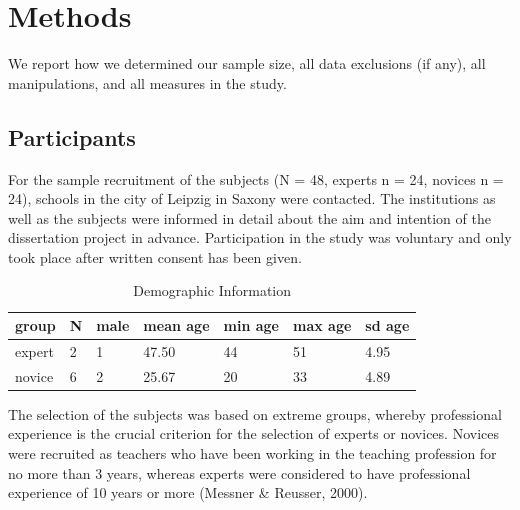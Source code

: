 \documentclass[
  english,
  man,floatsintext]{apa6}
\begin{document}
\hypertarget{methods}{%
\section{Methods}\label{methods}}

We report how we determined our sample size, all data exclusions (if any), all manipulations, and all measures in the study.

\hypertarget{participants}{%
\subsection{Participants}\label{participants}}

For the sample recruitment of the subjects (N = 48, experts n = 24, novices n = 24), schools in the city of Leipzig in Saxony were contacted. The institutions as well as the subjects were informed in detail about the aim and intention of the dissertation project in advance. Participation in the study was voluntary and only took place after written consent has been given.

\begin{table}[h]

\begin{center}
\begin{threeparttable}

\caption{\label{tab:demographicspilot1table,}Demographic Information}

\small{

\begin{tabular}{lllllll}
\toprule
group & \multicolumn{1}{c}{N} & \multicolumn{1}{c}{male} & \multicolumn{1}{c}{mean age} & \multicolumn{1}{c}{min age} & \multicolumn{1}{c}{max age} & \multicolumn{1}{c}{sd age}\\
\midrule
expert & 2 & 1 & 47.50 & 44 & 51 & 4.95\\
novice & 6 & 2 & 25.67 & 20 & 33 & 4.89\\
\bottomrule
\end{tabular}

}

\end{threeparttable}
\end{center}

\end{table}

The selection of the subjects was based on extreme groups, whereby professional experience is the crucial criterion for the selection of experts or novices. Novices were recruited as teachers who have been working in the teaching profession for no more than 3 years, whereas experts were considered to have professional experience of 10 years or more (Messner \& Reusser, 2000).
\end{document}
